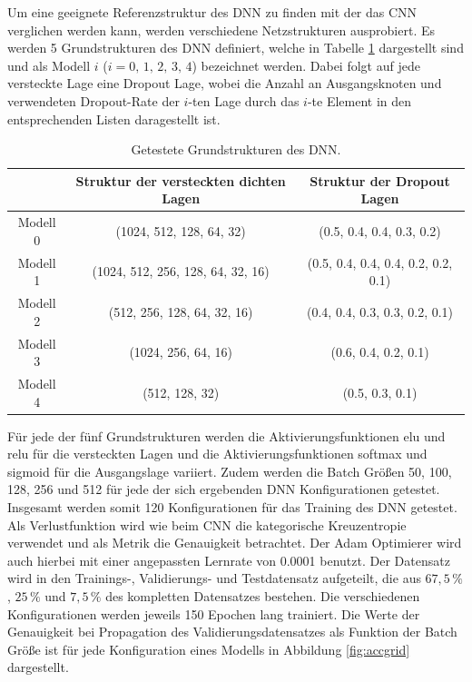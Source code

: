 Um eine geeignete Referenzstruktur des DNN zu finden mit der das CNN verglichen werden kann, werden verschiedene Netzstrukturen ausprobiert. Es werden 5 Grundstrukturen des DNN definiert, welche in Tabelle \ref{tab:DNNstruk} dargestellt sind und als Modell $i$ ($i = 0,\,1,\,2,\,3,\,4$) bezeichnet werden. Dabei folgt auf jede versteckte Lage eine Dropout Lage, wobei die Anzahl an Ausgangsknoten und verwendeten Dropout-Rate der $i$-ten Lage durch das $i$-te Element in den entsprechenden Listen daragestellt ist. \\
\begin{table}[!b]
\centering
\caption{Getestete Grundstrukturen des DNN.}
\label{tab:DNNstruk}
 \begin{tabular}{c|c|c}
 & Struktur der versteckten dichten Lagen & Struktur der Dropout Lagen \\
 \hline
 Modell 0 & (1024, 512, 128, 64, 32) & (0.5, 0.4, 0.4, 0.3, 0.2) \\
 Modell 1 & (1024, 512, 256, 128, 64, 32, 16) & (0.5, 0.4, 0.4, 0.4, 0.2, 0.2, 0.1)\\
 Modell 2 & (512, 256, 128, 64, 32, 16) & (0.4, 0.4, 0.3, 0.3, 0.2, 0.1)\\
 Modell 3 & (1024, 256, 64, 16) & (0.6, 0.4, 0.2, 0.1)\\
 Modell 4 & (512, 128, 32) &  (0.5, 0.3, 0.1)\\
 \end{tabular}
\end{table}
Für jede der fünf Grundstrukturen werden die Aktivierungsfunktionen elu und relu für die versteckten Lagen und die Aktivierungsfunktionen softmax und sigmoid für die Ausgangslage variiert. Zudem werden die Batch Größen 50, 100, 128, 256 und 512 für jede der sich ergebenden DNN Konfigurationen getestet. Insgesamt werden somit 120 Konfigurationen für das Training des DNN getestet. \\
Als Verlustfunktion wird wie beim CNN die kategorische Kreuzentropie verwendet und als Metrik die Genauigkeit betrachtet. Der Adam Optimierer wird auch hierbei mit einer angepassten Lernrate von 0.0001 benutzt. Der Datensatz wird in den Trainings-, Validierungs- und Testdatensatz aufgeteilt, die aus $67,5\,\%$, $25\,\%$ und $7,5\,\%$ des kompletten Datensatzes bestehen. Die verschiedenen Konfigurationen werden jeweils 150 Epochen lang trainiert. Die Werte der Genauigkeit bei Propagation des Validierungsdatensatzes als Funktion der Batch Größe ist für jede Konfiguration eines Modells in Abbildung \ref{fig:accgrid} dargestellt.\\
